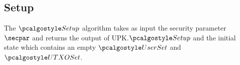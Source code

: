 \subsection{Setup}
The $\setup$ algorithm takes as input the security parameter $\secpar$ and returns the output of UPK.$\setup$ and the initial state which contains an empty $\usersset$ and $\utxoset$. 
